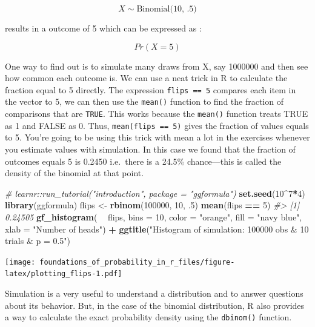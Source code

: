 \documentclass[]{article}
\newenvironment{Shaded}{\begin{snugshade}}{\end{snugshade}}
\newcommand{\CommentTok}[1]{\textcolor[rgb]{0.56,0.35,0.01}{\textit{#1}}}
\newcommand{\DataTypeTok}[1]{\textcolor[rgb]{0.13,0.29,0.53}{#1}}
\newcommand{\DecValTok}[1]{\textcolor[rgb]{0.00,0.00,0.81}{#1}}
\newcommand{\FloatTok}[1]{\textcolor[rgb]{0.00,0.00,0.81}{#1}}
\newcommand{\KeywordTok}[1]{\textcolor[rgb]{0.13,0.29,0.53}{\textbf{#1}}}
\newcommand{\NormalTok}[1]{#1}
\newcommand{\OperatorTok}[1]{\textcolor[rgb]{0.81,0.36,0.00}{\textbf{#1}}}
\newcommand{\StringTok}[1]{\textcolor[rgb]{0.31,0.60,0.02}{#1}}
\begin{document}
\[X  \sim \textrm{Binomial(10, .5)} \]

results in a outcome of 5 which can be expressed as :

\[Pr (X = 5)\]

One way to find out is to simulate many draws from X, say 1000000 and
then see how common each outcome is. We can use a neat trick in R to
calculate the fraction equal to 5 directly. The expression
\texttt{flips\ ==\ 5} compares each item in the vector to 5, we can then
use the \texttt{mean()} function to find the fraction of comparisons
that are \texttt{TRUE}. This works because the \texttt{mean()} function
treats TRUE as 1 and FALSE as 0. Thus, \texttt{mean(flips\ ==\ 5)} gives
the fraction of values equals to 5. You're going to be using this trick
with mean a lot in the exercises whenever you estimate values with
simulation. In this case we found that the fraction of outcomes equals 5
is 0.2450 i.e.~there is a 24.5\% chance---this is called the density of
the binomial at that point.

\begin{Shaded}
\begin{Highlighting}[]
\CommentTok{# learnr::run_tutorial("introduction", package = "ggformula")}
\KeywordTok{set.seed}\NormalTok{(}\DecValTok{10}\OperatorTok{^}\DecValTok{7}\OperatorTok{*}\DecValTok{4}\NormalTok{)}
\KeywordTok{library}\NormalTok{(ggformula)}
\NormalTok{flips <-}\StringTok{ }\KeywordTok{rbinom}\NormalTok{(}\DecValTok{100000}\NormalTok{, }\DecValTok{10}\NormalTok{, }\FloatTok{.5}\NormalTok{)}
\KeywordTok{mean}\NormalTok{(flips }\OperatorTok{==}\StringTok{ }\DecValTok{5}\NormalTok{) }
\CommentTok{#> [1] 0.24505}
\KeywordTok{gf_histogram}\NormalTok{( }\OperatorTok{~}\StringTok{ }\NormalTok{flips, }\DataTypeTok{bins =} \DecValTok{10}\NormalTok{, }
              \DataTypeTok{color =} \StringTok{"orange"}\NormalTok{, }
              \DataTypeTok{fill =} \StringTok{"navy blue"}\NormalTok{, }
              \DataTypeTok{xlab =} \StringTok{"Number of heads"}\NormalTok{) }\OperatorTok{+}\StringTok{ }\KeywordTok{ggtitle}\NormalTok{(}\StringTok{"Histogram of simulation: 100000 obs & 10 trials & p = 0.5"}\NormalTok{)}
\end{Highlighting}
\end{Shaded}

\texttt{[image: foundations\_of\_probability\_in\_r\_files/figure-latex/plotting\_flips-1.pdf]}

Simulation is a very useful to understand a distribution and to answer
questions about its behavior. But, in the case of the binomial
distribution, R also provides a way to calculate the exact probability
density using the \texttt{dbinom()} function.
\end{document}

